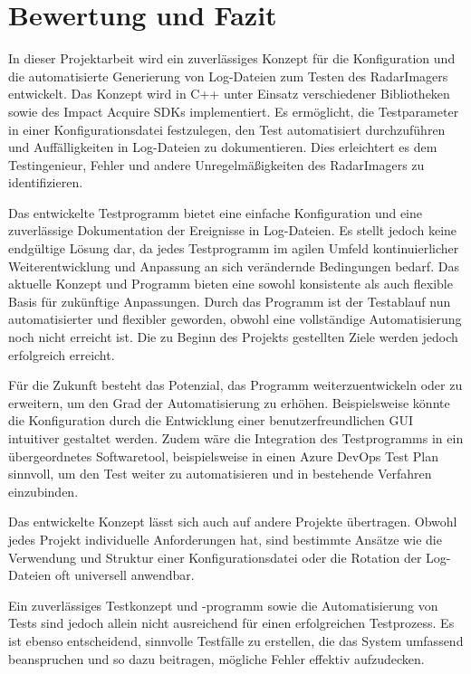 \chapter{Bewertung und Fazit}

In dieser Projektarbeit wird ein zuverlässiges Konzept für die Konfiguration und die automatisierte Generierung von Log-Dateien zum Testen des RadarImagers entwickelt. Das Konzept 
wird in C++ unter Einsatz verschiedener Bibliotheken sowie des Impact Acquire SDKs implementiert. Es ermöglicht, die Testparameter in einer Konfigurationsdatei festzulegen, den Test 
automatisiert durchzuführen und Auffälligkeiten in Log-Dateien zu dokumentieren. Dies erleichtert es dem Testingenieur, Fehler und andere Unregelmäßigkeiten des RadarImagers zu 
identifizieren.

Das entwickelte Testprogramm bietet eine einfache Konfiguration und eine zuverlässige Dokumentation der Ereignisse in Log-Dateien. Es stellt jedoch keine endgültige Lösung dar, 
da jedes Testprogramm im agilen Umfeld kontinuierlicher Weiterentwicklung und Anpassung an sich verändernde Bedingungen bedarf. Das aktuelle Konzept und Programm bieten eine sowohl konsistente als 
auch flexible Basis für zukünftige Anpassungen. Durch das Programm ist der Testablauf nun automatisierter und flexibler geworden, obwohl eine vollständige Automatisierung noch nicht 
erreicht ist. Die zu Beginn des Projekts gestellten Ziele werden jedoch erfolgreich erreicht.

Für die Zukunft besteht das Potenzial, das Programm weiterzuentwickeln oder zu erweitern, um den Grad der Automatisierung zu erhöhen. Beispielsweise könnte die Konfiguration durch 
die Entwicklung einer benutzerfreundlichen \acs{GUI} intuitiver gestaltet werden. Zudem wäre die Integration des Testprogramms in ein übergeordnetes Softwaretool, beispielsweise in 
einen Azure DevOps Test Plan sinnvoll, um den Test weiter zu automatisieren und in bestehende Verfahren einzubinden.

Das entwickelte Konzept lässt sich auch auf andere Projekte übertragen. Obwohl jedes Projekt individuelle Anforderungen hat, sind bestimmte Ansätze wie die Verwendung und Struktur 
einer Konfigurationsdatei oder die Rotation der Log-Dateien oft universell anwendbar.

Ein zuverlässiges Testkonzept und -programm sowie die Automatisierung von Tests sind jedoch allein nicht ausreichend für einen erfolgreichen Testprozess. Es ist ebenso entscheidend, 
sinnvolle Testfälle zu erstellen, die das System umfassend beanspruchen und so dazu beitragen, mögliche Fehler effektiv aufzudecken.